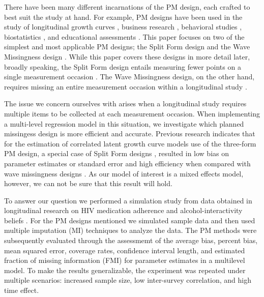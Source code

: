 \documentclass{svjour3}                     %
\begin{document}
There have been many different incarnations of the PM design, each crafted to best suit the study at hand. For example, PM designs have been used in the study of longitudinal growth curves \citep{graham2001planned, mcardle1997expanding}, business research \citep{shoemaker1973principles}, behavioral studies \citep{harel2015designed}, biostatistics \citep{andres2006partial, wacholder1994partial}, and educational assessments \citep{zeger1997efficient, sirotnik1977incidence}. This paper focuses on two of the simplest and most applicable PM designs; the Split Form design \citep{raghunathan1995split} and the Wave Missingness design \citep{little2013planned}. While this paper covers these designs in more detail later, broadly speaking, the Split Form design entails measuring fewer points on a single measurement occasion \citep{raghunathan1995split}. The Wave Missingness design, on the other hand, requires missing an entire measurement occasion within a longitudinal study \citep{graham2001planned}. 

The issue we concern ourselves with arises when a longitudinal study requires multiple items to be collected at each measurement occasion. When implementing a multi-level regression model in this situation, we investigate which planned missingess design is more efficient and accurate. Previous research indicates that for the estimation of correlated latent growth curve models use of the three-form PM design, a special case of Split Form designs \citep{raghunathan1995split}, resulted in low bias on parameter estimates or standard error and high efficiency when compared with wave missingness designs \citep{rhemtulla2014planned}. As our model of interest is a mixed effects model, however, we can not be sure that this result will hold. \par 

To answer our question we performed a simulation study from data obtained in longitudinal research on HIV medication adherence and alcohol-interactivity beliefs \citep{pellowski2016alcohol}. For the PM designs mentioned we simulated sample data and then used multiple imputation (MI) \citep{little2014statistical}  techniques to analyze the data. The PM methods were subsequently evaluated through the assessmemt of the average bias, percent bias, mean squared error, coverage rates, confidence interval length, and estimated fraction of missing information (FMI) \citep{little2014statistical} for parameter estimates in a multilevel model. To make the results generalizable, the experiment was repeated under multiple scenarios: increased sample size, low inter-survey correlation, and high time effect. \par
\end{document}
